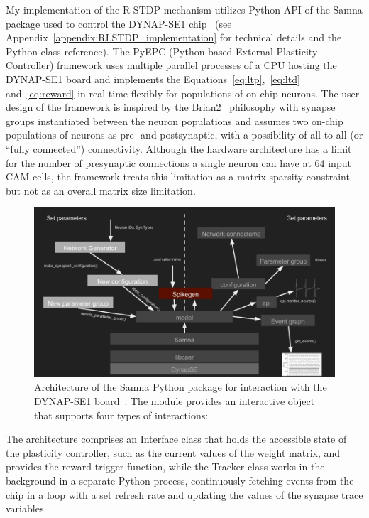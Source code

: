 My implementation of the R-STDP mechanism utilizes Python API of the Samna package used to control the DYNAP-SE1 chip~\cite{Samna} (see Appendix~\ref{appendix:RLSTDP_implementation} for technical details and the Python class reference). The PyEPC (Python-based External Plasticity Controller) framework uses multiple parallel processes of a CPU hosting the DYNAP-SE1 board and implements the Equations~\ref{eq:ltp},~\ref{eq:ltd} and~\ref{eq:reward} in real-time flexibly for populations of on-chip neurons. The user design of the framework is inspired by the Brian2~\cite{Stimberg_etal19} philosophy with synapse groups instantiated between the neuron populations and assumes two on-chip populations of neurons as pre- and postsynaptic, with a possibility of all-to-all (or ``fully connected'') connectivity. Although the hardware architecture has a limit for the number of presynaptic connections a single neuron can have at 64 input CAM cells, the framework treats this limitation as a matrix sparsity constraint but not as an overall matrix size limitation.

\begin{figure}[h]
    \centering
    \includegraphics[width=\textwidth]{img/chapter4/Samna_architecture.png}
    \caption[Samna Python module architecture]{Architecture of the Samna Python package for interaction with the DYNAP-SE1 board~\cite{Samna}. The module provides an interactive  object that supports four types of interactions:}
    \label{fig:enter-label}
\end{figure}

The architecture comprises an Interface class that holds the accessible state of the plasticity controller, such as the current values of the weight matrix, and provides the reward trigger function, while the Tracker class works in the background in a separate Python process, continuously fetching events from the chip in a loop with a set refresh rate and updating the values of the synapse trace variables.

